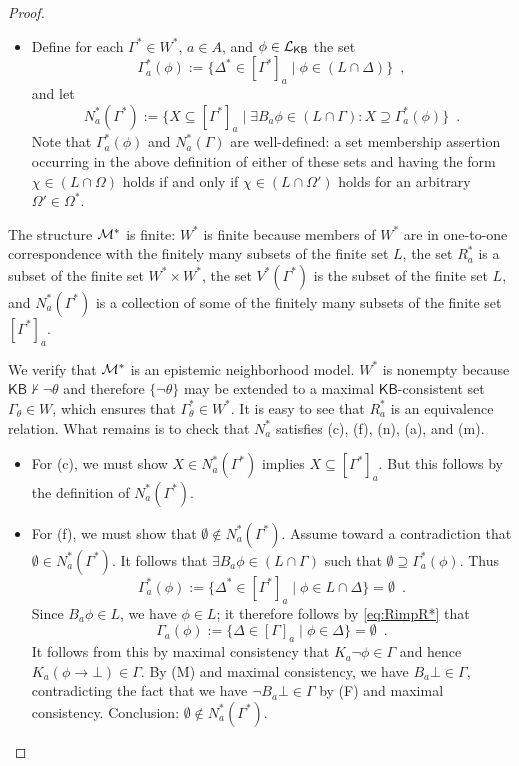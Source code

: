 \documentclass[12pt]{article}
\theoremstyle{definition}
\newcommand{\M}{{\cal M}}      %
\newcommand{\Lang}{{\cal L}}   %
\newcommand{\KB}{{\mathsf{KB}}}                     %
\begin{document}
\begin{proof}
\begin{itemize}
  \item Define for each $\Gamma^*\in W^*$, $a\in A$, and
    $\phi\in\Lang_\KB$ the set
    \[
    \textstyle \Gamma^*_a(\phi) :=
    \{\Delta^*\in[\Gamma^*]_a\mid\phi\in(L\cap\Delta)\}\enspace,
    \]
    and let
    \[
    \textstyle N^*_a(\Gamma^*):=\{X\subseteq[\Gamma^*]_a\mid \exists
    B_a\phi\in(L\cap\Gamma):X\supseteq\Gamma^*_a(\phi)\}\enspace.
    \]
    Note that $\Gamma^*_a(\phi)$ and $N^*_a(\Gamma)$ are well-defined:
    a set membership assertion occurring in the above definition of
    either of these sets and having the form $\chi\in(L\cap\Omega)$
    holds if and only if $\chi\in(L\cap\Omega')$ holds for an
    arbitrary $\Omega'\in\Omega^*$.
  \end{itemize}
  The structure $\M^*$ is finite: $W^*$ is finite because members of
  $W^*$ are in one-to-one correspondence with the finitely many
  subsets of the finite set $L$, the set $R^*_a$ is a subset of the
  finite set $W^*\times W^*$, the set $V^*(\Gamma^*)$ is the subset of
  the finite set $L$, and $N^*_a(\Gamma^*)$ is a collection of some of
  the finitely many subsets of the finite set $[\Gamma^*]_a$.

  We verify that $\M^*$ is an epistemic neighborhood model.  $W^*$ is
  nonempty because $\KB\nvdash\lnot\theta$ and therefore
  $\{\lnot\theta\}$ may be extended to a maximal $\KB$-consistent set
  $\Gamma_\theta\in W$, which ensures that $\Gamma_\theta^*\in W^*$.
  It is easy to see that $R^*_a$ is an equivalence relation.  What
  remains is to check that $N^*_a$ satisfies (c), (f), (n), (a), and
  (m).
  \begin{itemize}
  \item For (c), we must show $X\in N^*_a(\Gamma^*)$ implies
    $X\subseteq[\Gamma^*]_a$.  But this follows by the definition of
    $N^*_a(\Gamma^*)$.

  \item For (f), we must show that $\emptyset\notin N^*_a(\Gamma^*)$.
    Assume toward a contradiction that $\emptyset\in N^*_a(\Gamma^*)$.
    It follows that $\exists B_a\phi\in(L\cap\Gamma)$ such that
    $\emptyset\supseteq\Gamma^*_a(\phi)$.  Thus
    \[
    \Gamma^*_a(\phi):=\{\Delta^*\in[\Gamma^*]_a\mid \phi\in
    L\cap\Delta\}=\emptyset \enspace.
    \]
    Since $B_a\phi\in L$, we have $\phi\in L$; it therefore follows by
    \eqref{eq:RimpR*} that
    \[
    \Gamma_a(\phi):=\{\Delta\in[\Gamma]_a\mid \phi\in
    \Delta\}=\emptyset \enspace.
    \]
    It follows from this by maximal consistency that
    $K_a\lnot\phi\in\Gamma$ and hence $K_a(\phi\to\bot)\in\Gamma$. By
    (M) and maximal consistency, we have $B_a\bot\in\Gamma$,
    contradicting the fact that we have $\lnot B_a\bot\in\Gamma$ by
    (F) and maximal consistency.  Conclusion: $\emptyset\notin
    N^*_a(\Gamma^*)$.


\end{itemize}
\end{proof}
\end{document}
